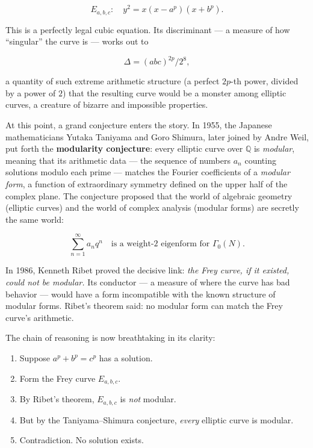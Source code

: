 \[E_{a,b,c} : \quad y^2 = x(x - a^p)(x + b^p).\]

This is a perfectly legal cubic equation. Its discriminant --- a measure of how ``singular'' the curve is --- works out to

\[\Delta = (abc)^{2p} / 2^8,\]

a quantity of such extreme arithmetic structure (a perfect \(2p\)-th power, divided by a power of \(2\)) that the resulting curve would be a monster among elliptic curves, a creature of bizarre and impossible properties.

At this point, a grand conjecture enters the story. In 1955, the Japanese mathematicians Yutaka Taniyama and Goro Shimura, later joined by Andr\textquotesingle e Weil, put forth the \textbf{modularity conjecture}: every elliptic curve over \(\mathbb{Q}\) is \emph{modular}, meaning that its arithmetic data --- the sequence of numbers \(a_n\) counting solutions modulo each prime --- matches the Fourier coefficients of a \emph{modular form}, a function of extraordinary symmetry defined on the upper half of the complex plane. The conjecture proposed that the world of algebraic geometry (elliptic curves) and the world of complex analysis (modular forms) are secretly the same world:

\[\sum_{n=1}^{\infty} a_n q^n \quad \text{is a weight-2 eigenform for } \Gamma_0(N).\]

In 1986, Kenneth Ribet proved the decisive link: \emph{the Frey curve, if it existed, could not be modular.} Its conductor --- a measure of where the curve has bad behavior --- would have a form incompatible with the known structure of modular forms. Ribet's theorem said: no modular form can match the Frey curve's arithmetic.

The chain of reasoning is now breathtaking in its clarity:

\begin{enumerate}
\def\labelenumi{\arabic{enumi}.}
\tightlist
\item
  Suppose \(a^p + b^p = c^p\) has a solution.
\item
  Form the Frey curve \(E_{a,b,c}\).
\item
  By Ribet's theorem, \(E_{a,b,c}\) is \emph{not} modular.
\item
  But by the Taniyama--Shimura conjecture, \emph{every} elliptic curve is modular.
\item
  Contradiction. No solution exists.
\end{enumerate}



